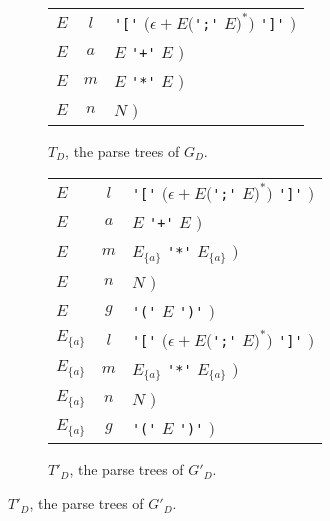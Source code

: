 \documentclass[acmsmall,review,anonymous]{acmart}\settopmatter{printfolios=true,printccs=false,printacmref=false}
\begin{document}
\begin{figure}
  \begin{subfigure}[t]{.45\linewidth}
    \centering
    \begin{tabular}{@{}l@{\quad$->$\quad}c@{$($ }l@{}}
      \toprule
      $E$ & $l$ & \verb|'['| $(\epsilon + E($\verb|';'| $E)^{*})$ \verb|']'| $)$ \\
      $E$ & $a$ & $E$ \verb|'+'| $E$ $)$ \\
      $E$ & $m$ & $E$ \verb|'*'| $E$ $)$ \\
      $E$ & $n$ & $N$ $)$ \\
      \bottomrule
    \end{tabular}
    \caption{$T_D$, the parse trees of $G_D$.}
    \label{fig:running-example-generated:t}
  \end{subfigure}%
%
  \begin{subfigure}[t]{.45\linewidth}
    \centering
    \begin{tabular}{@{}l@{\quad$->$\quad}c@{$($ }l@{}}
      \toprule
      $E$ & $l$ & \verb|'['| $(\epsilon + E($\verb|';'| $E)^{*})$ \verb|']'| $)$ \\
      $E$ & $a$ & $E$ \verb|'+'| $E$ $)$ \\
      $E$ & $m$ & $E_{\{a\}}$ \verb|'*'| $E_{\{a\}}$ $)$ \\
      $E$ & $n$ & $N$ $)$ \\
      $E$ & $g$ & \verb|'('| $E$ \verb|')'| $)$ \\
      \midrule
      $E_{\{a\}}$ & $l$ & \verb|'['| $(\epsilon + E($\verb|';'| $E)^{*})$ \verb|']'| $)$ \\
      $E_{\{a\}}$ & $m$ & $E_{\{a\}}$ \verb|'*'| $E_{\{a\}}$ $)$ \\
      $E_{\{a\}}$ & $n$ & $N$ $)$ \\
      $E_{\{a\}}$ & $g$ & \verb|'('| $E$ \verb|')'| $)$ \\
      \bottomrule
    \end{tabular}
    \caption{$T'_D$, the parse trees of $G'_D$.}
    \label{fig:running-example-generated:t-prime}
  \end{subfigure}


\end{figure}
\end{document}
